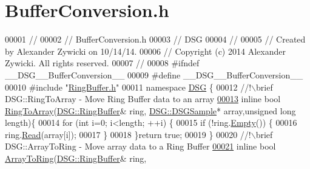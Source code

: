 \hypertarget{_buffer_conversion_8h_source}{\section{Buffer\+Conversion.\+h}
\label{_buffer_conversion_8h_source}
}

\begin{DoxyCode}
00001 \textcolor{comment}{//}
00002 \textcolor{comment}{//  BufferConversion.h}
00003 \textcolor{comment}{//  DSG}
00004 \textcolor{comment}{//}
00005 \textcolor{comment}{//  Created by Alexander Zywicki on 10/14/14.}
00006 \textcolor{comment}{//  Copyright (c) 2014 Alexander Zywicki. All rights reserved.}
00007 \textcolor{comment}{//}
00008 \textcolor{preprocessor}{#ifndef \_\_DSG\_\_BufferConversion\_\_}
00009 \textcolor{preprocessor}{#define \_\_DSG\_\_BufferConversion\_\_}
00010 \textcolor{preprocessor}{#include "\hyperlink{_ring_buffer_8h}{RingBuffer.h}"}
00011 \textcolor{keyword}{namespace }\hyperlink{namespace_d_s_g}{DSG} \{\textcolor{comment}{}
00012 \textcolor{comment}{    //!\(\backslash\)brief DSG::RingToArray - Move Ring Buffer data to an array}
\hypertarget{_buffer_conversion_8h_source_l00013}{}\hyperlink{namespace_d_s_g_a4049a445d7cb9ee4f9140bdfdbd5e11c}{00013} \textcolor{comment}{}    \textcolor{keyword}{inline} \textcolor{keywordtype}{bool} \hyperlink{namespace_d_s_g_a4049a445d7cb9ee4f9140bdfdbd5e11c}{RingToArray}(\hyperlink{class_d_s_g_1_1_ring_buffer}{DSG::RingBuffer}& ring,
      \hyperlink{namespace_d_s_g_ac39a94cd27ebcd9c1e7502d0c624894a}{DSG::DSGSample}* array,\textcolor{keywordtype}{unsigned} \textcolor{keywordtype}{long} length)\{
00014         \textcolor{keywordflow}{for} (\textcolor{keywordtype}{int} i=0; i<length; ++i) \{
00015             \textcolor{keywordflow}{if} (!ring.\hyperlink{class_d_s_g_1_1_ring_buffer_ac1346f5842d08b988a5297abe4089b96}{Empty}()) \{
00016                 ring.\hyperlink{class_d_s_g_1_1_ring_buffer_a6b2848a64f15c7b0c320779582fa0fbe}{Read}(array[i]);
00017             \}
00018         \}\textcolor{keywordflow}{return} \textcolor{keyword}{true};
00019     \}\textcolor{comment}{}
00020 \textcolor{comment}{    //!\(\backslash\)brief DSG::ArrayToRing - Move array data to a Ring Buffer}
\hypertarget{_buffer_conversion_8h_source_l00021}{}\hyperlink{namespace_d_s_g_a608643638b3a678c17b14c406d7edc85}{00021} \textcolor{comment}{}    \textcolor{keyword}{inline} \textcolor{keywordtype}{bool} \hyperlink{namespace_d_s_g_a608643638b3a678c17b14c406d7edc85}{ArrayToRing}(\hyperlink{class_d_s_g_1_1_ring_buffer}{DSG::RingBuffer}& ring,

\end{DoxyCode}
